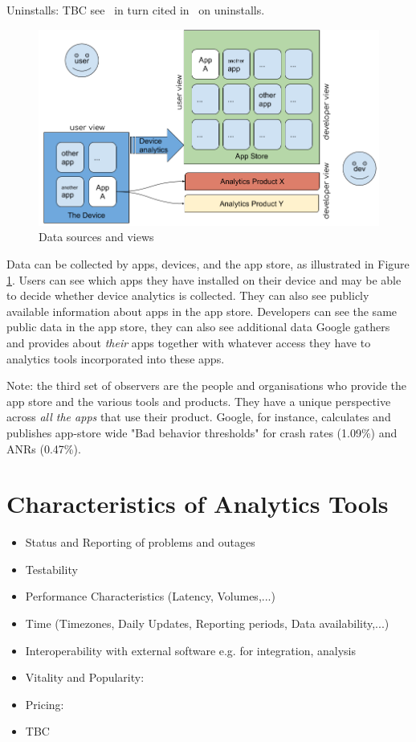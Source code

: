 Uninstalls: TBC see~\cite{bohmer2011falling_asleep_with_angry_birds} in turn cited in~\cite{lim_investigating_country_differences} on uninstalls. %

\begin{figure}[ht]
    \centering
    \includegraphics[width=\textwidth]{images/data_sources_and_views_25_jan_2020.jpg}
    \caption{Data sources and views}
    \label{fig:data_sources_and_views}
\end{figure}

Data can be collected by apps, devices, and the app store, as illustrated in Figure \ref{fig:data_sources_and_views}. Users can see which apps they have installed on their device and may be able to decide whether device analytics is collected. They can also see publicly available information about apps in the app store. Developers can see the same public data in the app store, they can also see additional data Google gathers and provides about \textit{their} apps together with whatever access they have to analytics tools incorporated into these apps.

Note: the third set of observers are the people and organisations who provide the app store and the various tools and products. They have a unique perspective across \textit{all the apps} that use their product. Google, for instance, calculates and publishes app-store wide "Bad behavior thresholds" for crash rates (1.09\%) and ANRs (0.47\%).

\section{Characteristics of Analytics Tools}


\begin{itemize}
    \item Status and Reporting of problems and outages
    \item Testability
    \item Performance Characteristics (Latency, Volumes,...)
    \item Time (Timezones, Daily Updates, Reporting periods, Data availability,...)
    \item Interoperability with external software e.g. for integration, analysis
    \item Vitality and Popularity: 
    \item Pricing:
    \item TBC
\end{itemize}
